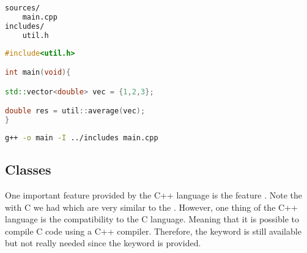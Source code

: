 \begin{minipage}{\linewidth}

\begin{minipage}{0.45\linewidth}
\begin{lstlisting}[language=bash,caption={Folder structure for a project with header files.\label{code:folder:header}}]
sources/
    main.cpp
includes/
    util.h
\end{lstlisting}
\end{minipage}
\hfill
\begin{minipage}{0.45\linewidth}
\begin{lstlisting}[language=c++,caption={Example for the main.cpp file using a header file.\label{code:main:header}}]
#include<util.h>

int main(void){

std::vector<double> vec = {1,2,3};

double res = util::average(vec);
}
\end{lstlisting}
\end{minipage}


\begin{minipage}{\linewidth}
\begin{lstlisting}[language=bash,caption={Compilation of the main.cpp file using a header file.\label{code:compile:header}}]
g++ -o main -I ../includes main.cpp
\end{lstlisting}
\end{minipage}

\end{minipage}


\subsection{Classes}
\label{sec:intro:cpp}
One important feature provided by the C++ language is the feature . Note the with C we had  which are very similar to the . However, one thing of the C++ language is the compatibility to the C language. Meaning that it is possible to compile C code using a C++ compiler. Therefore, the  keyword is still available but not really needed since the keyword  is provided. \\

